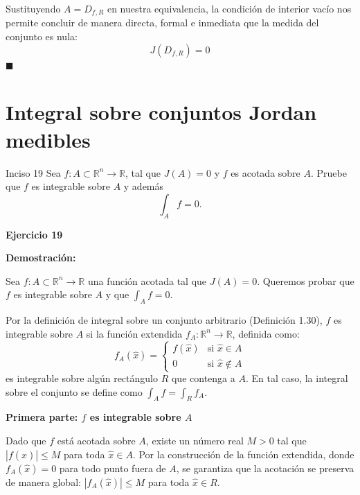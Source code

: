 \documentclass[11pt,letterpaper]{article}
\begin{document}
Sustituyendo $A = D_{f,R}$ en nuestra equivalencia, la condición de interior vacío nos permite concluir de manera directa, formal e inmediata que la medida del conjunto es nula:
\begin{equation*}
J(D_{f,R}) = 0
\end{equation*}
\hfill $\blacksquare$


\section*{Integral sobre conjuntos Jordan medibles}

\begin{inciso}{Inciso 19}
Sea $f:A\subset\mathbb{R}^{n}\rightarrow\mathbb{R}$, tal que $J(A)=0$ y $f$ es acotada sobre $A$. Pruebe que $f$ es integrable sobre $A$ y además
\begin{equation*}
    \int_{A}f=0.
\end{equation*}
\end{inciso}

\textbf{Ejercicio 19}

\textbf{Demostración:}

Sea $f: A \subset \mathbb{R}^n \rightarrow \mathbb{R}$ una función acotada tal que $J(A) = 0$. Queremos probar que $f$ es integrable sobre $A$ y que $\int_A f = 0$.

Por la definición de integral sobre un conjunto arbitrario (Definición 1.30), $f$ es integrable sobre $A$ si la función extendida $f_A: \mathbb{R}^n \rightarrow \mathbb{R}$, definida como:
\begin{equation*}
f_A(\hat{x}) = 
\begin{cases} 
f(\hat{x}) & \text{si } \hat{x} \in A \\ 
0 & \text{si } \hat{x} \notin A 
\end{cases}
\end{equation*}
es integrable sobre algún rectángulo $R$ que contenga a $A$. En tal caso, la integral sobre el conjunto se define como $\int_A f = \int_R f_A$.

\vspace{0.5cm}
\textbf{Primera parte: $f$ es integrable sobre $A$}

Dado que $f$ está acotada sobre $A$, existe un número real $M > 0$ tal que $|f(\hat{x})| \le M$ para toda $\hat{x} \in A$. Por la construcción de la función extendida, donde $f_A(\hat{x}) = 0$ para todo punto fuera de $A$, se garantiza que la acotación se preserva de manera global: $|f_A(\hat{x})| \le M$ para toda $\hat{x} \in R$.
\end{document}
